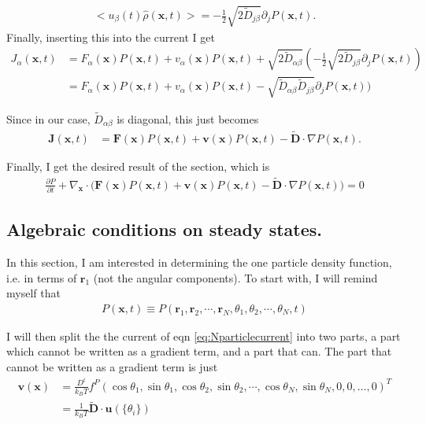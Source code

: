 \documentclass{article}
\begin{document}
\begin{align}
  <u_{\beta}(t)\hat{\rho}(\bm{x},t)>=-\frac{1}{2}\sqrt{2\tilde{D}_{j\beta}}
  \partial_jP(\bm{x},t).
\end{align}
Finally, inserting this into the current I get
\begin{align}
  J_{\alpha}(\bm{x},t)&=F_{\alpha}(\bm{x})P(\bm{x},t)+v_{\alpha}(\bm{x})P(\bm{x},t)
                        +\sqrt{2\tilde{D}_{\alpha\beta}}(-\frac{1}{2}\sqrt{2\tilde{D}_{j\beta}}
                        \partial_jP(\bm{x},t))\nonumber\\
                      &=F_{\alpha}(\bm{x})P(\bm{x},t)+v_{\alpha}(\bm{x})P(\bm{x},t)
                        -\sqrt{\tilde{D}_{\alpha\beta}\tilde{D}_{j\beta}}
                        \partial_jP(\bm{x},t))
\end{align}

Since in our case, $\tilde{D}_{\alpha\beta}$ is diagonal, this just becomes
\begin{align}\label{eq:Nparticlecurrent}
  \bm{J}(\bm{x},t)&=\bm{F}(\bm{x})P(\bm{x},t)+\bm{v}(\bm{x})P(\bm{x},t)
                    -\bm{\tilde{D}}\cdot\nabla P(\bm{x},t).
\end{align}

Finally, I get the desired result of the section, which is
\begin{align}\label{eq:NparticleFP}
  \frac{\partial P}{\partial t} + \nabla_{\bm{x}}\cdot\big(\bm{F}(\bm{x})P(\bm{x},t)
  +\bm{v}(\bm{x})P(\bm{x},t)-\bm{\tilde{D}}\cdot\nabla P(\bm{x},t)\big)=0
\end{align}


\subsection{Algebraic conditions on steady states.}

In this section, I am interested in determining the one particle density function, i.e. in
terms of $\bm{r}_1$ (not the angular components). To start with, I will remind myself that
\begin{align}
  P(\bm{x},t)\equiv P(\bm{r}_1,\bm{r}_2,\cdots,\bm{r}_N,\theta_1,\theta_2,\cdots,\theta_N,t)
\end{align}

I will then split the the current of eqn \ref{eq:Nparticlecurrent} into two parts, a part which
cannot be written as a gradient term, and a part that can. The part that cannot be written as
a gradient term is just
\begin{align}\label{eq:dissipative_force}
  \bm{v}(\bm{x})&=\frac{D^t}{k_BT}f^P(\cos\theta_1,\sin\theta_1,\cos\theta_2,
                  \sin\theta_2,\cdots,\cos\theta_N,\sin\theta_N,0,0,\dots,0)^T\nonumber\\
                &=\frac{1}{k_BT}\bm{\tilde{D}}\cdot \bm{u}(\{\theta_i\})
\end{align}
\end{document}
